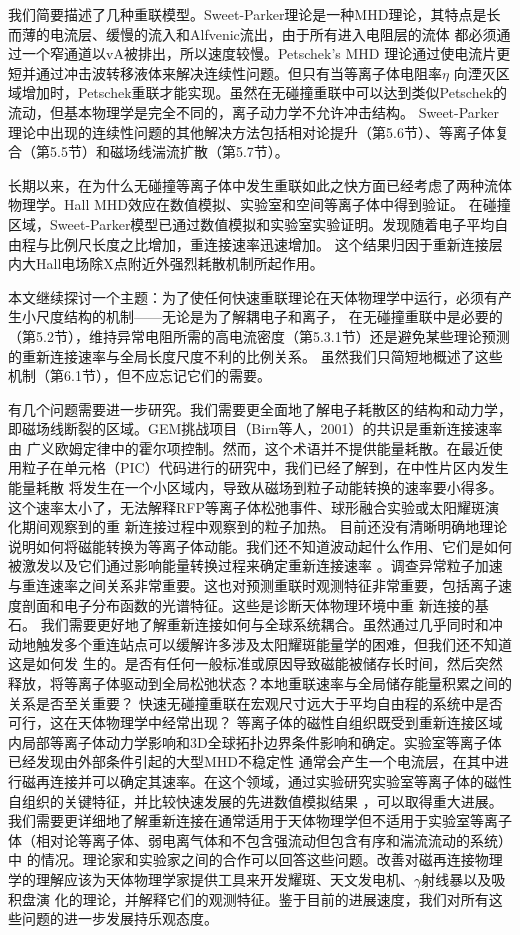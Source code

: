 \documentclass[12pt, a4paper, oneside]{article}
\begin{document}
\begin{spacing}{2.0}
我们简要描述了几种重联模型。Sweet-Parker理论是一种MHD理论，其特点是长而薄的电流层、缓慢的流入和Alfvenic流出，由于所有进入电阻层的流体
都必须通过一个窄通道以vA被排出，所以速度较慢。Petschek's MHD 理论通过使电流片更短并通过冲击波转移液体来解决连续性问题。但只有当等离子体电阻率$\eta$
向湮灭区域增加时，Petschek重联才能实现。虽然在无碰撞重联中可以达到类似Petschek的流动，但基本物理学是完全不同的，离子动力学不允许冲击结构。
Sweet-Parker理论中出现的连续性问题的其他解决方法包括相对论提升（第5.6节）、等离子体复合（第5.5节）和磁场线湍流扩散（第5.7节）。

长期以来，在为什么无碰撞等离子体中发生重联如此之快方面已经考虑了两种流体物理学。Hall MHD效应在数值模拟、实验室和空间等离子体中得到验证。
在碰撞区域，Sweet-Parker模型已通过数值模拟和实验室实验证明。发现随着电子平均自由程与比例尺长度之比增加，重连接速率迅速增加。
这个结果归因于重新连接层内大Hall电场除X点附近外强烈耗散机制所起作用。

本文继续探讨一个主题：为了使任何快速重联理论在天体物理学中运行，必须有产生小尺度结构的机制——无论是为了解耦电子和离子，
在无碰撞重联中是必要的（第5.2节），维持异常电阻所需的高电流密度（第5.3.1节）还是避免某些理论预测的重新连接速率与全局长度尺度不利的比例关系。
虽然我们只简短地概述了这些机制（第6.1节），但不应忘记它们的需要。

有几个问题需要进一步研究。我们需要更全面地了解电子耗散区的结构和动力学，即磁场线断裂的区域。GEM挑战项目（Birn等人，2001）的共识是重新连接速率由
广义欧姆定律中的霍尔项控制。然而，这个术语并不提供能量耗散。在最近使用粒子在单元格（PIC）代码进行的研究中，我们已经了解到，在中性片区内发生能量耗散
将发生在一个小区域内，导致从磁场到粒子动能转换的速率要小得多。这个速率太小了，无法解释RFP等离子体松弛事件、球形融合实验或太阳耀斑演化期间观察到的重
新连接过程中观察到的粒子加热。
目前还没有清晰明确地理论说明如何将磁能转换为等离子体动能。我们还不知道波动起什么作用、它们是如何被激发以及它们通过影响能量转换过程来确定重新连接速率
。调查异常粒子加速与重连速率之间关系非常重要。这也对预测重联时观测特征非常重要，包括离子速度剖面和电子分布函数的光谱特征。这些是诊断天体物理环境中重
新连接的基石。
我们需要更好地了解重新连接如何与全球系统耦合。虽然通过几乎同时和冲动地触发多个重连站点可以缓解许多涉及太阳耀斑能量学的困难，但我们还不知道这是如何发
生的。是否有任何一般标准或原因导致磁能被储存长时间，然后突然释放，将等离子体驱动到全局松弛状态？本地重联速率与全局储存能量积累之间的关系是否至关重要？
快速无碰撞重联在宏观尺寸远大于平均自由程的系统中是否可行，这在天体物理学中经常出现？
等离子体的磁性自组织既受到重新连接区域内局部等离子体动力学影响和3D全球拓扑边界条件影响和确定。实验室等离子体已经发现由外部条件引起的大型MHD不稳定性
通常会产生一个电流层，在其中进行磁再连接并可以确定其速率。在这个领域，通过实验研究实验室等离子体的磁性自组织的关键特征，并比较快速发展的先进数值模拟结果
，可以取得重大进展。
我们需要更详细地了解重新连接在通常适用于天体物理学但不适用于实验室等离子体（相对论等离子体、弱电离气体和不包含强流动但包含有序和湍流流动的系统）中
的情况。理论家和实验家之间的合作可以回答这些问题。改善对磁再连接物理学的理解应该为天体物理学家提供工具来开发耀斑、天文发电机、$\gamma$射线暴以及吸积盘演
化的理论，并解释它们的观测特征。鉴于目前的进展速度，我们对所有这些问题的进一步发展持乐观态度。





\end{spacing}
\end{document}
